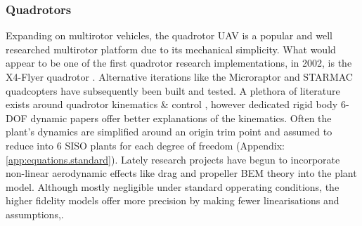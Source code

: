 \subsubsection*{Quadrotors}
Expanding on multirotor vehicles, the quadrotor UAV is a popular and well researched multirotor platform due to its mechanical simplicity. What would appear to be one of the first quadrotor research implementations, in 2002, is the X4-Flyer quadrotor \cite{x4flyer,x4flyercontrol}. Alternative iterations like the Microraptor\cite{microraptor} and STARMAC\cite{starmac} quadcopters have subsequently been built and tested. A plethora of literature exists around quadrotor kinematics \& control \cite{dynamicmodelling2013, dynamicmodelling2009, modelingquadcopter, quaddynamics, fullquadcoptercontrol}, however dedicated rigid body 6-DOF dynamic papers \cite{rigidbodylecture,eulerrigidbody} offer better explanations of the kinematics. Often the plant's dynamics are simplified around an origin trim point and assumed to reduce into 6 SISO plants for each degree of freedom (Appendix:\ref{app:equations.standard}). Lately research projects have begun to incorporate non-linear aerodynamic effects like drag and propeller BEM theory into the plant model\cite{lowreynolds,bem,starmac}. Although mostly negligible under standard opperating conditions, the higher fidelity models offer more precision by making fewer linearisations and assumptions,\cite{nonlineardynamics,starmac}.
\par
